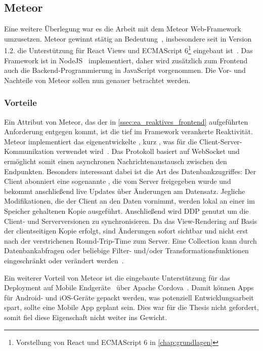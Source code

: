 \subsection{Meteor}
\label{ssec:el_meteor}

Eine weitere Überlegung war es die Arbeit mit dem Meteor Web-Framework
umzusetzen.  Meteor gewinnt stätig an Bedeutung~\cite{hotframeworks},
insbesondere seit in Version 1.2. die Unterstützung für React Views und
ECMAScript 6\footnote{Vorstellung von React und ECMAScript 6 in
\cref{chap:grundlagen}} eingebaut ist~\cite{meteor12}.  Das Framework ist in
NodeJS~\cite{nodejs} implementiert, daher wird zusätzlich zum Frontend auch die
Backend-Programmierung in JavaScript vorgenommen.  Die Vor- und Nachteile von
Meteor sollen nun genauer betrachtet werden.

\subsubsection{Vorteile}
\label{sssec:elm_vorteile}

Ein Attribut von Meteor, das der in \cref{ssec:ea_reaktives_frontend}
aufgeführten Anforderung entgegen kommt, ist die tief im Framework verankerte
Reaktivität.  Meteor implementiert das eigenentwickelte
, kurz ,
was für die Client-Server-Kommunikation verwendet wird~\cite{ddp}.  Das
Protokoll basiert auf WebSocket und ermöglicht somit einen asynchronen
Nachrichtenaustausch zwischen den Endpunkten.  Besonders interessant dabei ist
die Art des Datenbankzugriffes:  Der Client abonniert eine sogenannte
, die vom Server freigegeben wurde und bekommt
anschließend live Updates über Änderungen am Datensatz.  Jegliche
Modifikationen, die der Client an den Daten vornimmt, werden lokal an einer im
Speicher gehaltenen Kopie ausgeführt.  Anschließend wird DDP genutzt um die
Client- und Serverversionen zu synchronisieren.  Da das View-Rendering auf
Basis der clientseitigen Kopie erfolgt, sind Änderungen sofort sichtbar und
nicht erst nach der verstrichenen Round-Trip-Time zum Server.  Eine Collection
kann durch Datenbankabfragen oder beliebige Filter- und/oder
Transformationsfunktionen eingeschränkt oder verändert werden~\cite{meteordoc}.

Ein weiterer Vorteil von Meteor ist die eingebaute Unterstützung für das
Deployment auf Mobile Endgeräte~\cite{meteormobile} über Apache
Cordova~\cite{cordova}.  Damit können Apps für Android- und iOS-Geräte gepackt
werden, was potenziell Entwicklungsarbeit spart, sollte eine Mobile App geplant
sein.  Dies war für die Thesis nicht gefordert, somit fiel diese Eigenschaft
nicht weiter ins Gewicht.

